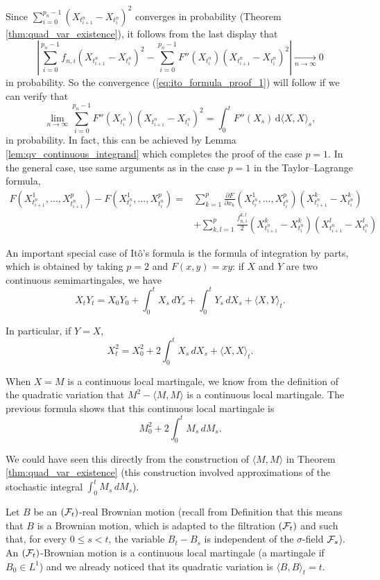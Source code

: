 \documentclass[../Main.tex]{subfiles}
\begin{document}
{Since $\sum_{i=0}^{p_n-1} (X_{t_{i+1}^n} - X_{t_i^n})^2$ converges in probability (Theorem \ref{thm:quad_var_existence}), it follows from the last display that
\[
\left| \sum_{i=0}^{p_n-1} f_{n,i}(X_{t_{i+1}^n} - X_{t_i^n})^2 - \sum_{i=0}^{p_n-1} F''(X_{t_i^n})(X_{t_{i+1}^n} - X_{t_i^n})^2 \right| \xrightarrow[n \to \infty]{} 0
\]
in probability. So the convergence (\ref{eq:ito_formula_proof_1}) will follow if we can verify that
$$\lim_{n \to \infty} \sum_{i=0}^{p_n-1} F''(X_{t_i^n})(X_{t_{i+1}^n} - X_{t_i^n})^2 = \int_0^t F''(X_s) \, \mathrm{d}\langle X, X \rangle_s,$$
in probability. In fact, this can be achieved by Lemma \ref{lem:qv_continuous_integrand} which completes the proof of the case $p = 1$. In the general case, use same arguments as in the case $p = 1$ in the Taylor--Lagrange formula, 
\begin{align*}
F(X_{t_{i+1}^n}^1, \dots, X_{t_{i+1}^n}^p) - F(X_{t_i^n}^1, \dots, X_{t_i^n}^p) ={}& \sum_{k=1}^p \frac{\partial F}{\partial x_k}(X_{t_i^n}^1, \dots, X_{t_i^n}^p)(X_{t_{i+1}^n}^k - X_{t_i^n}^k) \\
& + \sum_{k,l=1}^p \frac{f_{n,i}^{k,l}}{2} (X_{t_{i+1}^n}^k - X_{t_i^n}^k)(X_{t_{i+1}^n}^l - X_{t_i^n}^l)
\end{align*}
}

An important special case of Itô's formula is the formula of integration by
parts, which is obtained by taking \(p=2\) and \(F(x,y)=xy\): if \(X\) and
\(Y\) are two continuous semimartingales, we have
\[ X_tY_t = X_0Y_0+\int_0^t X_s\,dY_s+\int_0^t Y_s\,dX_s+\langle X,Y\rangle_t. \]

In particular, if \(Y=X\),
\[ X_t^2 = X_0^2+2\int_0^t X_s\,dX_s+\langle X,X\rangle_t.
\]

When \(X=M\) is a continuous local martingale, we know from the definition of
the quadratic variation that \(M^2-\langle M,M\rangle\) is a continuous local
martingale. The previous formula shows that this continuous local martingale is
\[ M_0^2+2\int_0^t M_s\,dM_s. \]

We could have seen this directly from the construction of \(\langle M,M\rangle\)
in Theorem \ref{thm:quad_var_existence} (this construction involved approximations of the stochastic
integral \(\int_0^t M_s\,dM_s\)).

Let \(B\) be an \((\mathcal{F}_t)\)-real Brownian motion (recall from Definition that this means that \(B\) is a Brownian motion, which is adapted to the filtration \((\mathcal{F}_t)\) and such that, for every \(0\leq s<t\), the variable \(B_t-B_s\) is independent of the \(\sigma\)-field \(\mathcal{F}_s\)). An \((\mathcal{F}_t)\)-Brownian motion is a continuous local martingale (a martingale if \(B_0\in L^1\)) and we already noticed that its quadratic variation is \(\langle B,B\rangle_t=t\).
\end{document}

